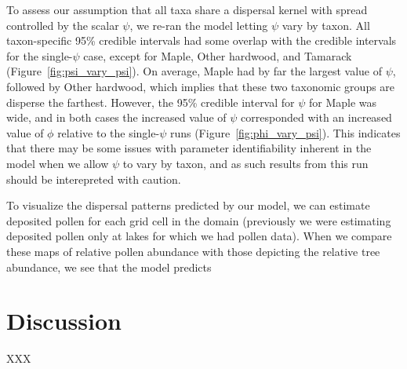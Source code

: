 \documentclass[12pt]{article}
\begin{document}
To assess our assumption that all taxa share a dispersal kernel with
spread controlled by the scalar $\psi$, we re-ran the model letting
$\psi$ vary by taxon. All taxon-specific 95\% credible intervals had
some overlap with the credible intervals for the single-$\psi$ case,
except for Maple, Other hardwood, and Tamarack
(Figure~\ref{fig:psi_vary_psi}). On average, Maple had by far the
largest value of $\psi$, followed by Other hardwood, which implies
that these two taxonomic groups are disperse the farthest. However,
the 95\% credible interval for $\psi$ for Maple was wide, and in both
cases the increased value of $\psi$ corresponded with an increased
value of $\phi$ relative to the single-$\psi$ runs
(Figure~\ref{fig:phi_vary_psi}). This indicates that there may be
some issues with parameter identifiability inherent in the model when
we allow $\psi$ to vary by taxon, and as such results from this run
should be interepreted with caution.

To visualize the dispersal patterns predicted by our model, we can estimate deposited pollen for each grid cell in the domain (previously we were estimating deposited pollen only at lakes for which we had pollen data). When we compare these maps of relative pollen abundance with those depicting the relative tree abundance, we see that the model predicts 

\section{Discussion}

XXX







\end{document}

